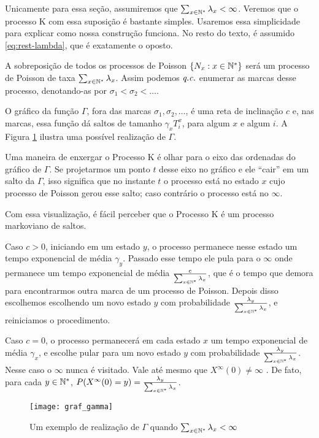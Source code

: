 Unicamente para essa seção, assumiremos que $\sum_{x \in {\mathbb{N^*}}}
\lambda_x < \infty$. Veremos que o processo K com essa suposição é
bastante simples. Usaremos essa simplicidade para explicar como nossa
construção funciona.  No resto do texto, é assumido
\eqref{eq:rest-lambda}, que é exatamente o oposto.

A sobreposição de todos os processos de Poisson $\{N_x : x \in {\mathbb{N^*}}\}$
será um processo de Poisson de taxa $\sum_{x \in {\mathbb{N^*}}}
\lambda_x$. Assim podemos ${\emph{q.c.}}$ enumerar as marcas desse processo,
denotando-as por \mbox{$ \sigma_1 < \sigma_2 < \ldots$}.

O gráfico da função $\Gamma$, fora das marcas $\sigma_1, \sigma_2,
\ldots$, é uma reta de inclinação $c$ e, nas marcas, essa função dá
saltos de tamanho $\gamma_x T^x_i$, para algum $x$ e algum $i$. A
Figura \ref{fig:graf_gamma} ilustra uma possível realização de
$\Gamma$.

Uma maneira de enxergar o Processo K é olhar para o eixo das ordenadas
do gráfico de $\Gamma$. Se projetarmos um ponto $t$ desse eixo no
gráfico e ele ``cair'' em um salto da $\Gamma$, isso significa que no
instante $t$ o processo está no estado $x$ cujo processo de Poisson
gerou esse salto; caso contrário o processo está no $\infty$.

Com essa visualização, é fácil perceber que o Processo K é um processo
markoviano de saltos.

Caso $c > 0$, iniciando em um estado $y$, o processo permanece nesse
estado um tempo exponencial de média $\gamma_y$. Passado esse tempo
ele pula para o $\infty$ onde permanece um tempo exponencial de média
$\frac{c}{\sum_{x \in {\mathbb{N^*}}} \lambda_x}$, que é o tempo que demora para
encontrarmos outra marca de um processo de Poisson. Depois disso
escolhemos escolhendo um novo estado $y$ com probabilidade
$\frac{\lambda_y}{\sum_{x \in {\mathbb{N^*}}} \lambda_x}$, e reiniciamos o
procedimento.

Caso $c=0$, o processo permanecerá em cada estado $x$ um tempo
exponencial de média $\gamma_x$, e escolhe pular para um novo estado
$y$ com probabilidade $\frac{\lambda_y}{\sum_{x \in {\mathbb{N^*}}} \lambda_x}$.
Nesse caso o $\infty$ nunca é visitado. Vale até mesmo que
$X^\infty(0) \neq \infty$ \qc. De fato, para cada $y \in {\mathbb{N^*}}$, 
$P(X^\infty(0) = y) = \frac{\lambda_y}{\sum_{x \in {\mathbb{N^*}}} \lambda_x}$.

\begin{figure}
  \centering
  \texttt{[image: graf\_gamma]}
  \caption{Um exemplo de realização de $\Gamma$ quando $\sum_{x \in
      {\mathbb{N^*}}} \lambda_x < \infty$}
  \label{fig:graf_gamma}
\end{figure}

